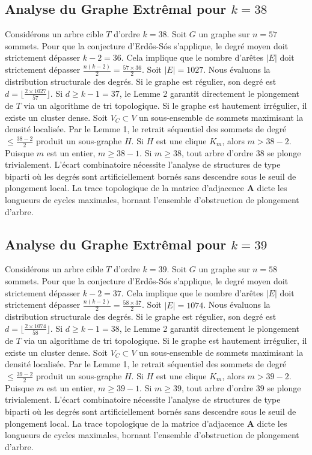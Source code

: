 \documentclass[11pt,a4paper]{article}
\begin{document}
\subsection{Analyse du Graphe Extr\^emal pour $k=38$}
Consid\'erons un arbre cible $T$ d'ordre $k=38$.
Soit $G$ un graphe sur $n=57$ sommets.
Pour que la conjecture d'Erd\H{o}s-S\'os s'applique, le degr\'e moyen doit strictement d\'epasser $k-2 = 36$.
Cela implique que le nombre d'ar\^etes $|E|$ doit strictement d\'epasser $\frac{n(k-2)}{2} = \frac{57 \times 36}{2}$.
Soit $|E| = 1027$.
Nous \'evaluons la distribution structurale des degr\'es. Si le graphe est r\'egulier, son degr\'e est $d = \lfloor \frac{2 \times 1027}{57} \rfloor$.
Si $d \geq k-1 = 37$, le Lemme 2 garantit directement le plongement de $T$ via un algorithme de tri topologique.
Si le graphe est hautement irr\'egulier, il existe un cluster dense. Soit $V_C \subset V$ un sous-ensemble de sommets maximisant la densit\'e localis\'ee.
Par le Lemme 1, le retrait s\'equentiel des sommets de degr\'e $\leq \frac{38-2}{2}$ produit un sous-graphe $H$.
Si $H$ est une clique $K_{m}$, alors $m > 38-2$. Puisque $m$ est un entier, $m \geq 38-1$. Si $m \geq 38$, tout arbre d'ordre $38$ se plonge trivialement.
L'\'ecart combinatoire n\'ecessite l'analyse de structures de type biparti o\`u les degr\'es sont artificiellement born\'es sans descendre sous le seuil de plongement local. La trace topologique de la matrice d'adjacence $\mathbf{A}$ dicte les longueurs de cycles maximales, bornant l'ensemble d'obstruction de plongement d'arbre.


\subsection{Analyse du Graphe Extr\^emal pour $k=39$}
Consid\'erons un arbre cible $T$ d'ordre $k=39$.
Soit $G$ un graphe sur $n=58$ sommets.
Pour que la conjecture d'Erd\H{o}s-S\'os s'applique, le degr\'e moyen doit strictement d\'epasser $k-2 = 37$.
Cela implique que le nombre d'ar\^etes $|E|$ doit strictement d\'epasser $\frac{n(k-2)}{2} = \frac{58 \times 37}{2}$.
Soit $|E| = 1074$.
Nous \'evaluons la distribution structurale des degr\'es. Si le graphe est r\'egulier, son degr\'e est $d = \lfloor \frac{2 \times 1074}{58} \rfloor$.
Si $d \geq k-1 = 38$, le Lemme 2 garantit directement le plongement de $T$ via un algorithme de tri topologique.
Si le graphe est hautement irr\'egulier, il existe un cluster dense. Soit $V_C \subset V$ un sous-ensemble de sommets maximisant la densit\'e localis\'ee.
Par le Lemme 1, le retrait s\'equentiel des sommets de degr\'e $\leq \frac{39-2}{2}$ produit un sous-graphe $H$.
Si $H$ est une clique $K_{m}$, alors $m > 39-2$. Puisque $m$ est un entier, $m \geq 39-1$. Si $m \geq 39$, tout arbre d'ordre $39$ se plonge trivialement.
L'\'ecart combinatoire n\'ecessite l'analyse de structures de type biparti o\`u les degr\'es sont artificiellement born\'es sans descendre sous le seuil de plongement local. La trace topologique de la matrice d'adjacence $\mathbf{A}$ dicte les longueurs de cycles maximales, bornant l'ensemble d'obstruction de plongement d'arbre.
\end{document}
